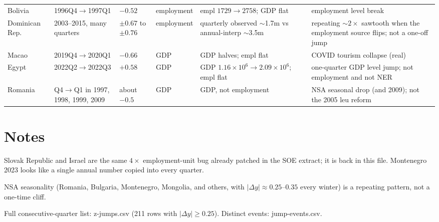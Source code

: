 \documentclass[11pt]{article}
\begin{document}
{\begin{longtable}{@{}llp{2.6cm}lp{3.6cm}p{6.8cm}@{}}
\addlinespace
Bolivia & 1996Q4$\to$1997Q1 & $-0.52$ & employment & empl $1729\to 2758$; GDP flat &
employment level break \\
\addlinespace
Dominican Rep. & 2003--2015, many quarters & $\pm 0.67$ to $\pm 0.76$ & employment &
quarterly observed $\sim$1.7m vs annual-interp $\sim$3.5m &
repeating $\sim 2\times$ sawtooth when the employment source flips; not a one-off jump \\
\addlinespace
Macao & 2019Q4$\to$2020Q1 & $-0.66$ & GDP & GDP halves; empl flat &
COVID tourism collapse (real) \\
\addlinespace
Egypt & 2022Q2$\to$2022Q3 & $+0.58$ & GDP & GDP $1.16\times 10^6\to 2.09\times 10^6$; empl flat &
one-quarter GDP level jump; not employment and not NER \\
\addlinespace
Romania & Q4$\to$Q1 in 1997, 1998, 1999, 2009 & about $-0.5$ & GDP & GDP, not employment &
NSA seasonal drop (and 2009); not the 2005 leu reform \\
\end{longtable}
}

\section{Notes}

Slovak Republic and Israel are the same $4\times$ employment-unit bug already
patched in the SOE extract; it is back in this file.
Montenegro 2023 looks like a single annual number copied into every quarter.

NSA seasonality (Romania, Bulgaria, Montenegro, Mongolia, and others, with
$|\Delta y|\approx 0.25$--$0.35$ every winter) is a repeating pattern, not a
one-time cliff.

Full consecutive-quarter list: z-jumps.csv (211 rows with
$|\Delta y|\ge 0.25$). Distinct events: jump-events.csv.
\end{document}
